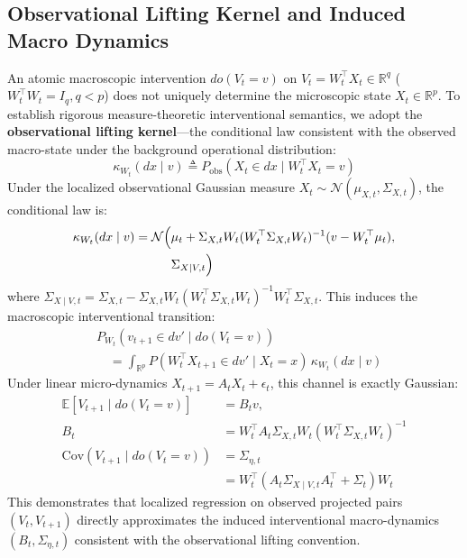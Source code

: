 \documentclass[10pt,twocolumn,journal]{article}
\begin{document}
\subsection{Observational Lifting Kernel and Induced Macro Dynamics}
An atomic macroscopic intervention $do(V_t = v)$ on $V_t = W_t^\top X_t \in \mathbb{R}^q$ ($W_t^\top W_t = I_q, q < p$) does not uniquely determine the microscopic state $X_t \in \mathbb{R}^p$. To establish rigorous measure-theoretic interventional semantics, we adopt the \textbf{observational lifting kernel}—the conditional law consistent with the observed macro-state under the background operational distribution:
\begin{equation}
\kappa_{W_t}(dx \mid v) \triangleq P_{\text{obs}}(X_t \in dx \mid W_t^\top X_t = v)
\label{eq:lifting_kernel}
\end{equation}
Under the localized observational Gaussian measure $X_t \sim \mathcal{N}(\mu_{X, t}, \Sigma_{X, t})$, the conditional law is:
\begin{equation}
\begin{aligned}
\kappa_{W_t}(dx \mid v) = \mathcal{N}\Bigl( &\mu_t + \Sigma_{X, t} W_t (W_t^\top \Sigma_{X, t} W_t)^{-1}(v - W_t^\top \mu_t), \\
&\Sigma_{X \mid V, t}\Bigr)
\end{aligned}
\end{equation}
where $\Sigma_{X \mid V, t} = \Sigma_{X, t} - \Sigma_{X, t} W_t (W_t^\top \Sigma_{X, t} W_t)^{-1} W_t^\top \Sigma_{X, t}$. This induces the macroscopic interventional transition:
\begin{equation}
\begin{aligned}
&P_{W_t}(v_{t+1} \in dv' \mid do(V_t = v)) \\
&\quad = \int_{\mathbb{R}^p} P(W_t^\top X_{t+1} \in dv' \mid X_t = x) \, \kappa_{W_t}(dx \mid v)
\end{aligned}
\end{equation}
Under linear micro-dynamics $X_{t+1} = A_t X_t + \epsilon_t$, this channel is exactly Gaussian:
\begin{equation}
\begin{aligned}
\mathbb{E}[V_{t+1} \mid do(V_t = v)] &= B_t v, \\
B_t &= W_t^\top A_t \Sigma_{X, t} W_t (W_t^\top \Sigma_{X, t} W_t)^{-1} \\
\mathrm{Cov}(V_{t+1} \mid do(V_t = v)) &= \Sigma_{\eta, t} \\
&= W_t^\top (A_t \Sigma_{X \mid V, t} A_t^\top + \Sigma_t) W_t
\end{aligned}
\end{equation}
This demonstrates that localized regression on observed projected pairs $(V_t, V_{t+1})$ directly approximates the induced interventional macro-dynamics $(B_t, \Sigma_{\eta, t})$ consistent with the observational lifting convention.
\end{document}
